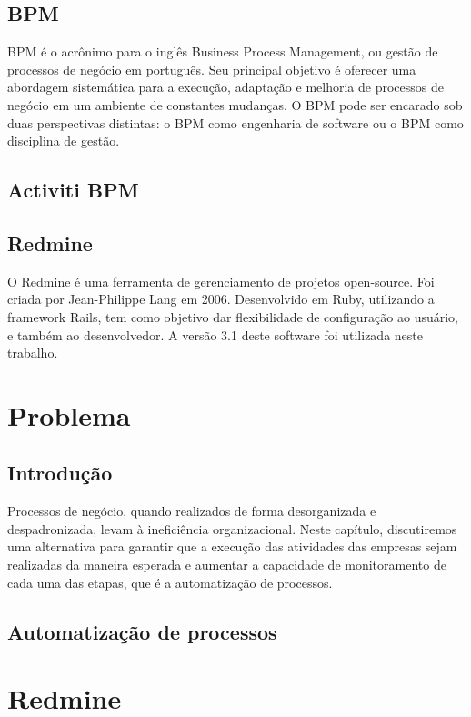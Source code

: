 \section{BPM}\label{sec:LABEL_CHP_2_SEC_C}
BPM é o acrônimo para o inglês Business Process Management, ou gestão de processos de negócio em português. Seu principal objetivo é oferecer uma abordagem sistemática para a execução, adaptação e melhoria de processos de negócio em um ambiente de constantes mudanças. O BPM pode ser encarado sob duas perspectivas distintas: o BPM como engenharia de software ou o BPM como disciplina de gestão.

\section{Activiti BPM}\label{sec:LABEL_CHP_2_SEC_D}


\section{Redmine}\label{sec:LABEL_CHP_2_SEC_E}
O Redmine é uma ferramenta de gerenciamento de projetos open-source. Foi criada por Jean-Philippe Lang em 2006. Desenvolvido em Ruby, utilizando a framework Rails, tem como objetivo dar flexibilidade de configuração ao usuário, e também ao desenvolvedor. A versão 3.1 deste software foi utilizada neste trabalho.


\chapter{Problema}\label{chp:LABEL_CHP_3}

\section{Introdução}\label{sec:LABEL_CHP_3_SEC_A}
Processos de negócio, quando realizados de forma desorganizada e despadronizada, levam à ineficiência organizacional. Neste capítulo, discutiremos uma alternativa para garantir que a execução das atividades das empresas sejam realizadas da maneira esperada e aumentar a capacidade de monitoramento de cada uma das etapas, que é a automatização de processos. 

\section{Automatização de processos}\label{sec:LABEL_CHP_3_SEC_B}


\chapter{Redmine}\label{chp:LABEL_CHP_3}

